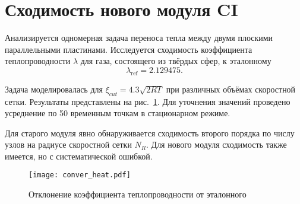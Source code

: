 \documentclass[english,russian,a4paper,12pt]{article}
\begin{document}
\section*{Сходимость нового модуля CI}

Анализируется одномерная задача переноса тепла между двумя плоскими параллельными пластинами.
Исследуется сходимость коэффициента теплопроводности \(\lambda\) для газа, состоящего из твёрдых сфер, к эталонному
\[ \lambda_\mathrm{ref} = 2.129475. \]

Задача моделировалась для \(\xi_{cut} = 4.3 \sqrt{2RT}\) при различных объёмах скоростной сетки.
Результаты представлены на рис.~\ref{fig:deviation}.
Для уточнения значений проведено усреднение по 50 временным точкам в стационарном режиме.

Для старого модуля явно обнаруживается сходимость второго порядка по числу узлов на радиусе скоростной сетки \(N_R\).
Для нового модуля сходимость также имеется, но с систематической ошибкой.

\begin{figure}[ht]
	\centering
	\texttt{[image: conver\_heat.pdf]}
	\caption{Отклонение коэффициента теплопроводности от эталонного}\label{fig:deviation}
\end{figure}
\end{document}
